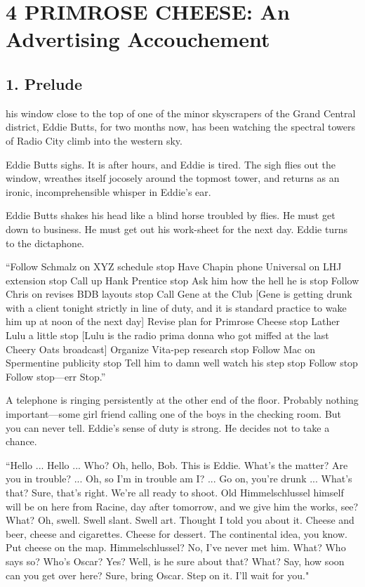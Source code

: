 \documentclass[twoside,nohyper,openany,nobib]{tufte-book}
\let\oldchapter\chapter
\def\chapter{%
  \setcounter{footnote}{0}%
  \oldchapter
}
\begin{document}
\chapter[4 \hspace*{1mm} PRIMROSE CHEESE: An Advertising Accouchement]{4 PRIMROSE CHEESE: An Advertising Accouchement}

\section{1. Prelude}

 his window close to the top of one of the minor skyscrapers of the
Grand Central district, Eddie Butts, for two months now, has been
watching the spectral towers of Radio City climb into the western sky.



Eddie Butts sighs. It is after hours, and Eddie is tired. The sigh flies
out the window, wreathes itself jocosely around the topmost tower, and
returns as an ironic, incomprehensible whisper in Eddie's ear.

Eddie Butts shakes his head like a blind horse troubled by flies. He
must get down to business. He must get out his work-sheet for the next
day. Eddie turns to the dictaphone.

``Follow Schmalz on XYZ schedule stop Have Chapin phone Universal on LHJ
extension stop Call up Hank Prentice stop Ask him how the hell he is
stop Follow Chris on revises BDB layouts stop Call Gene at the Club
{[}Gene is getting drunk with a client tonight strictly in line of duty,
and it is standard practice to wake him up at noon of the next day{]}
Revise plan for Primrose Cheese stop Lather Lulu a little stop {[}Lulu
is the radio prima donna who got miffed at the last Cheery Oats
broadcast{]} Organize Vita-pep research stop Follow Mac on Spermentine
publicity stop Tell him to damn well watch his step stop Follow stop
Follow stop---err Stop.''

A telephone is ringing persistently at the other end of the floor.
Probably nothing important---some girl friend calling one of the boys in
the checking room. But you can never tell. Eddie's sense of duty is
strong. He decides not to take a chance.

``Hello ... Hello ... Who? Oh, hello, Bob. This is Eddie. What's the
matter? Are you in trouble? ... Oh, so I'm in trouble am I? ... Go on,
you're drunk ... What's that? Sure, that's right. We're all ready to
shoot. Old Himmelschlussel himself will be on here from Racine, day
after tomorrow, and we give him the works, see? What? Oh, swell. Swell
slant. Swell art. Thought I told you about it. Cheese and beer, cheese
and cigarettes. Cheese for dessert. The continental idea, you know. Put
cheese on the map. Himmelschlussel? No, I've never met him. What? Who
says so? Who's Oscar? Yes? Well, is he sure about that? What? Say, how
soon can you get over here? Sure, bring Oscar. Step on it. I'll wait for
you."
\end{document}
